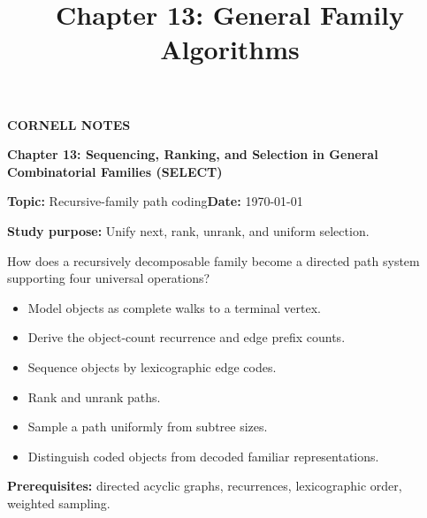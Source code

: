 \documentclass[10pt,letterpaper]{article}
\title{Chapter 13: General Family Algorithms}
\author{}
\date{}
\begin{document}
\maketitle
\begin{tcolorbox}[colback=Paper,colframe=Ink]{\small\bfseries\color{Teal}CORNELL NOTES}\par{\LARGE\bfseries Chapter 13: Sequencing, Ranking, and Selection in General Combinatorial Families (SELECT)}\par\medskip\textbf{Topic:} Recursive-family path coding\hfill\textbf{Date:} \today\par\textbf{Study purpose:} Unify next, rank, unrank, and uniform selection.\end{tcolorbox}
\begin{tcolorbox}[colback=Teal!5,colframe=Teal,title=Essential question]How does a recursively decomposable family become a directed path system supporting four universal operations?\end{tcolorbox}
\begin{tcolorbox}[colback=white,colframe=Mist,title=Learning objectives]\begin{itemize}\item Model objects as complete walks to a terminal vertex.\item Derive the object-count recurrence and edge prefix counts.\item Sequence objects by lexicographic edge codes.\item Rank and unrank paths.\item Sample a path uniformly from subtree sizes.\item Distinguish coded objects from decoded familiar representations.\end{itemize}\textbf{Prerequisites:} directed acyclic graphs, recurrences, lexicographic order, weighted sampling.\end{tcolorbox}
\end{document}
